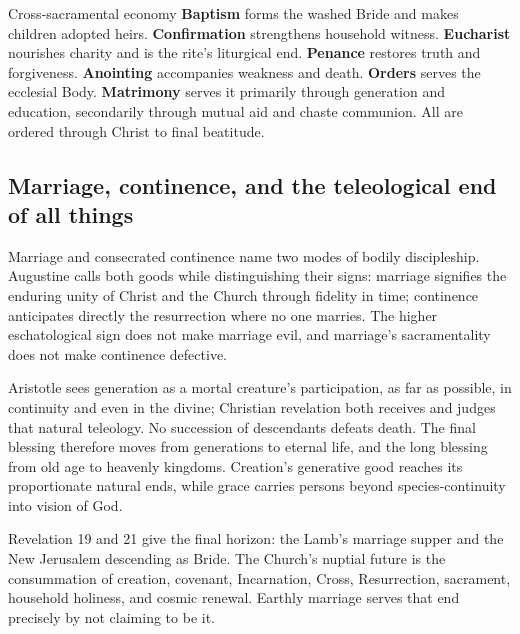 \begin{deepstudy}
\begin{massbox}{Cross-sacramental economy}
\textbf{Baptism} forms the washed Bride and makes children adopted heirs. \textbf{Confirmation} strengthens household witness. \textbf{Eucharist} nourishes charity and is the rite's liturgical end. \textbf{Penance} restores truth and forgiveness. \textbf{Anointing} accompanies weakness and death. \textbf{Orders} serves the ecclesial Body. \textbf{Matrimony} serves it primarily through generation and education, secondarily through mutual aid and chaste communion. All are ordered through Christ to final beatitude.
\end{massbox}

\sectionguard
\subsection*{Marriage, continence, and the teleological end of all things}

Marriage and consecrated continence name two modes of bodily discipleship. Augustine calls both goods while distinguishing their signs: marriage signifies the enduring unity of Christ and the Church through fidelity in time; continence anticipates directly the resurrection where no one marries. The higher eschatological sign does not make marriage evil, and marriage's sacramentality does not make continence defective.

Aristotle sees generation as a mortal creature's participation, as far as possible, in continuity and even in the divine; Christian revelation both receives and judges that natural teleology. No succession of descendants defeats death. The final blessing therefore moves from generations to eternal life, and the long blessing from old age to heavenly kingdoms. Creation's generative good reaches its proportionate natural ends, while grace carries persons beyond species-continuity into vision of God.

Revelation 19 and 21 give the final horizon: the Lamb's marriage supper and the New Jerusalem descending as Bride. The Church's nuptial future is the consummation of creation, covenant, Incarnation, Cross, Resurrection, sacrament, household holiness, and cosmic renewal. Earthly marriage serves that end precisely by not claiming to be it.


\end{deepstudy}
